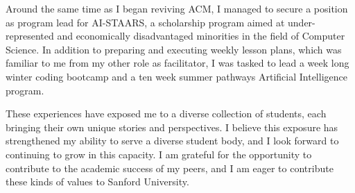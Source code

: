 \documentclass[12pt]{article}
\begin{document}
Around the same time as I began reviving ACM, I managed to secure a position as program lead for AI-STAARS, a scholarship program aimed at
under-represented and economically disadvantaged minorities in the field of Computer Science.  In addition to preparing and executing weekly
lesson plans, which was familiar to me from my other role as facilitator, I was tasked to lead a week long winter coding bootcamp and a ten
week summer pathways Artificial Intelligence program.

These experiences have exposed me to a diverse collection of students, each bringing their own unique stories and perspectives.  I
believe this exposure has strengthened my ability to serve a diverse student body, and I look forward to continuing to grow in this
capacity. I am grateful for the opportunity to contribute to the academic success of my peers, and I am eager to contribute these kinds of
values to Sanford University.
\end{document}

